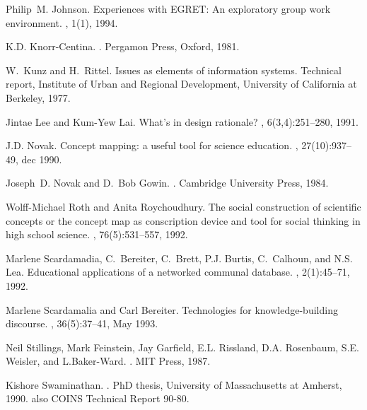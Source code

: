 \begin{thebibliography}{1}
Philip~M. Johnson.
\newblock Experiences with {EGRET}: An exploratory group work environment.
, 1(1), 1994.

K.D. Knorr-Centina.
.
\newblock Pergamon Press, Oxford, 1981.

W.~Kunz and H.~Rittel.
\newblock Issues as elements of information systems.
\newblock Technical report, Institute of Urban and Regional Development,
  University of California at Berkeley, 1977.

Jintae Lee and Kum-Yew Lai.
\newblock What's in design rationale?
, 6(3,4):251--280, 1991.

J.D. Novak.
\newblock Concept mapping: a useful tool for science education.
, 27(10):937--49, dec
  1990.

Joseph~D. Novak and D.~Bob Gowin.
.
\newblock Cambridge University Press, 1984.

Wolff-Michael Roth and Anita Roychoudhury.
\newblock The social construction of scientific concepts or the concept map as
  conscription device and tool for social thinking in high school science.
, 76(5):531--557, 1992.

Marlene Scardamadia, C.~Bereiter, C.~Brett, P.J. Burtis, C.~Calhoun, and N.S.
  Lea.
\newblock Educational applications of a networked communal database.
, 2(1):45--71, 1992.

Marlene Scardamalia and Carl Bereiter.
\newblock Technologies for knowledge-building discourse.
, 36(5):37--41, May 1993.

Neil Stillings, Mark Feinstein, Jay Garfield, E.L. Rissland, D.A. Rosenbaum,
  S.E. Weisler, and L.Baker-Ward.
.
\newblock MIT Press, 1987.

Kishore Swaminathan.
.
\newblock PhD thesis, University of Massachusetts at Amherst, 1990.
\newblock also COINS Technical Report 90-80.


\end{thebibliography}
